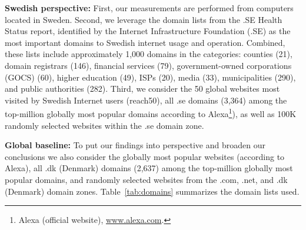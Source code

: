 \documentclass[letterpaper]{sig-alternate-10pt}
\begin{document}

{\bf Swedish perspective:}  
First, our measurements are performed from computers located in Sweden.
Second, we leverage the domain lists from the .SE Health Status report\cite{LoWa12},
identified by the Internet Infrastructure Foundation (.SE) as the most important domains
to Swedish internet usage and operation.
Combined, these lists include approximately 1,000 domains in the
categories: counties (21), domain registrars (146), financial services (79), 
government-owned corporations (GOCS) (60), higher education (49), 
ISPs (20), media (33), municipalities (290), and public authorities (282).
Third, we consider the 50 global websites most visited by Swedish Internet users (reach50),
all .se domains (3,364) among the top-million globally most popular domains
according to Alexa\footnote{ Alexa (official website), \url{www.alexa.com}.}),
as well as 100K randomly selected websites within the .se domain zone.

{\bf Global baseline:}  
To put our findings into perspective and 
broaden our conclusions we
also consider the globally most popular websites (according to Alexa),
all .dk (Denmark) domains (2,637) among the top-million globally most popular domains,
and randomly selected websites from the .com, .net, and .dk (Denmark) domain zones.
Table~\ref{tab:domains} summarizes the domain lists used.
\end{document}

